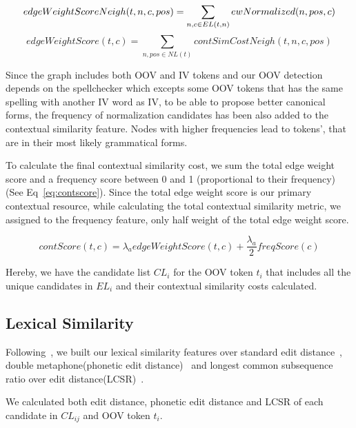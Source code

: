 \documentclass[preprint,review,12pt]{elsarticle}
\begin{document}
\begin{equation}
edgeWeightScoreNeigh(t,n,c,pos) = \sum_{n,c \in EL(t,n)}{ewNormalized(n,pos,c)} \\\\
\end{equation}
\begin{equation}
edgeWeightScore(t,c) = \sum_{n,pos \in NL(t) }{contSimCostNeigh(t,n,c,pos)}
\label{eq:wscore}
\end{equation}

Since the graph includes both OOV and IV tokens and our OOV detection depends on the spellchecker which excepts some OOV tokens that has the same spelling with another IV word as IV, to be able to propose better canonical forms, the frequency of normalization candidates has been also added to the contextual similarity feature. Nodes with higher frequencies lead to tokens', that are in their most likely grammatical forms.

To calculate the final contextual similarity cost, we sum the total edge weight score and a frequency score between 0 and 1 (proportional to their frequency) (See Eq~\ref{eq:contscore}). Since the total edge weight score is our primary contextual resource, while calculating the total contextual similarity metric, we assigned to the frequency feature, only half weight of the total edge weight score.

\begin{equation}
contScore(t,c) = \lambda_a edgeWeightScore(t,c) + \frac{\lambda_a} 2 freqScore(c)
\label{eq:contscore}
\end{equation}

Hereby, we have the candidate list $CL_{i}$ for the OOV token $t_i$ that includes all the unique candidates in $EL_{i}$ and their contextual similarity costs calculated.

\subsection{Lexical Similarity}

Following~\cite{Han:2011:LNS:2002472.2002520,DBLP:conf/acl/HassanM13}, we built our lexical similarity features over standard edit distance~\cite{levenshtein1966bcc}, double metaphone(phonetic edit distance)~\cite{Philips:2000:DMS:349124.349132} and longest common subsequence ratio over edit distance(LCSR)~\cite{Contractor:2010:UCN:1944566.1944588}.

We calculated both edit distance, phonetic edit distance and LCSR of each candidate in $CL_{ij}$ and OOV token $t_i$.
\end{document}
